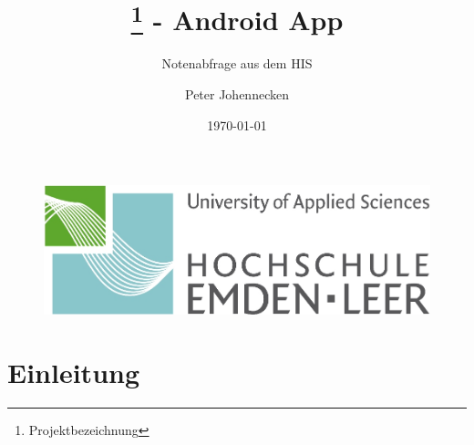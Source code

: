 \documentclass[parskip=full-]{scrartcl}
\author{Peter Johennecken}
\title{\er\footnote{Projektbezeichnung} - Android App}
\subtitle{Notenabfrage aus dem HIS}
\date {\today}
\begin{document}
\maketitle
\begin{figure}[H]
	\centering
	\includegraphics[scale=.5]{img/hs}
\end{figure}
\begin{abstract}
\end{abstract}
\tableofcontents
\newpage
\section{Einleitung}
\end{document}
